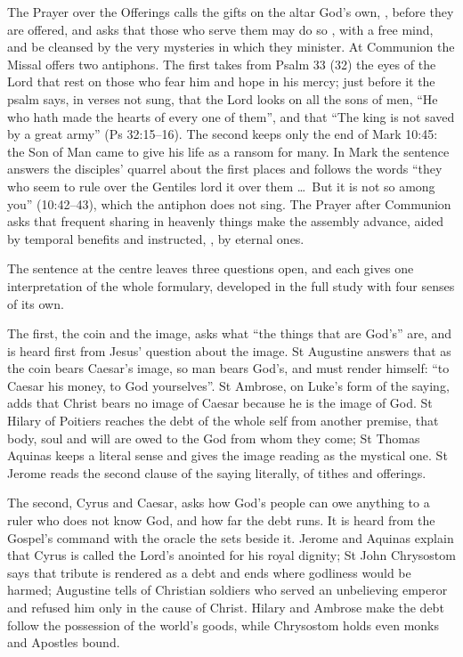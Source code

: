 The Prayer over the Offerings calls the gifts on the altar God's own,
, before they are offered, and asks that those who serve them
may do so , with a free mind, and be cleansed by the very
mysteries in which they minister. At Communion the Missal offers two
antiphons. The first takes from Psalm 33 (32) the eyes of the Lord that rest on
those who fear him and hope in his mercy; just before it the psalm says, in
verses not sung, that the Lord looks on all the sons of men, ``He who hath made
the hearts of every one of them'', and that ``The king is not saved by a great
army'' (Ps 32:15--16). The second keeps only the end of Mark 10:45: the Son of
Man came to give his life as a ransom for many. In Mark the sentence answers
the disciples' quarrel about the first places and follows the words ``they who
seem to rule over the Gentiles lord it over them \ldots\ But it is not so among
you'' (10:42--43), which the antiphon does not sing. The Prayer after Communion
asks that frequent sharing in heavenly things make the assembly advance, aided
by temporal benefits and instructed, , by eternal ones.

The sentence at the centre leaves three questions open, and each gives one
interpretation of the whole formulary, developed in the full study with four
senses of its own.

The first, the coin and the image, asks what ``the things that are God's''
are, and is heard first from Jesus' question about the image. St Augustine
answers that as the coin bears Caesar's image, so man bears God's, and must
render himself: ``to Caesar his money, to God yourselves''. St Ambrose, on
Luke's form of the saying, adds that Christ bears no image of Caesar because
he is the image of God. St Hilary of Poitiers reaches the debt of the whole
self from another premise, that body, soul and will are owed to the God from
whom they come; St Thomas Aquinas keeps a literal sense and gives the image
reading as the mystical one. St Jerome reads the second clause of the saying
literally, of tithes and offerings.

The second, Cyrus and Caesar, asks how God's people can owe anything to a
ruler who does not know God, and how far the debt runs. It is heard from the
Gospel's command with the oracle the  sets beside it. Jerome and
Aquinas explain that Cyrus is called the Lord's anointed for his royal
dignity; St John Chrysostom says that tribute is rendered as a debt and ends
where godliness would be harmed; Augustine tells of Christian soldiers who
served an unbelieving emperor and refused him only in the cause of Christ.
Hilary and Ambrose make the debt follow the possession of the world's goods,
while Chrysostom holds even monks and Apostles bound.

